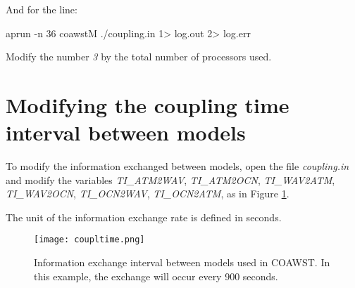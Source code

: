 \noindent And for the line:
\bigskip

\begin{bashcode}
aprun -n 36 coawstM ./coupling.in 1> log.out 2> log.err
\end{bashcode}
\bigskip

\noindent Modify the number \textit{3} by the total number of processors used.
\bigskip

\section{Modifying the coupling time interval between models}
\bigskip

\noindent To modify the information exchanged between models, open the file \textit{coupling.in} and
modify the variables \textit{TI\_ATM2WAV}, \textit{TI\_ATM2OCN}, \textit{TI\_WAV2ATM}, \textit{TI\_WAV2OCN}, \textit{TI\_OCN2WAV},
          \textit{TI\_OCN2ATM}, as in Figure \textcolor{bleu_cite}{\ref{taxaacopla}}.
\bigskip

\begin{tcolorbox}[enhanced,
  grow to left by=0cm,%
  grow to right by=0cm,%
  enlarge top by=0cm,%
  enlarge bottom by=0cm,%
  tcbox raise base,
  boxrule=1.0pt,
  left=18mm,
  colframe=red!50!black,coltext=red!25!black,colback=red!10!white,
  overlay={\begin{tcbclipinterior}\fill[red!75!blue!50!white] (frame.south west)
    rectangle node[text=white,font=\sffamily\bfseries\footnotesize,rotate=0] {WARNING} ([xshift=18mm]frame.north west);\end{tcbclipinterior}}]
    The unit of the information exchange rate is defined in seconds.
\end{tcolorbox}
\bigskip

\begin{figure}[H]
    \centering
    \texttt{[image: coupltime.png]}
    \caption{Information exchange interval between models used in COAWST. In this example, the exchange will occur every 900 seconds.}
    \label{taxaacopla}
\end{figure}
\bigskip
